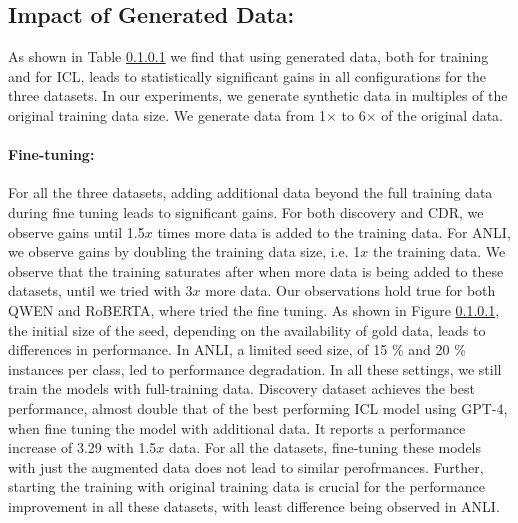 


\subsection{Impact of Generated Data:} 

As shown in Table \ref{} we find that using generated data, both for training and for ICL, leads to statistically significant gains in all configurations for the three datasets. In our experiments, we generate synthetic data in multiples of the original training data size. We generate data from 1$\times$ to 6$\times$ of the original data. 


\paragraph{Fine-tuning:} For all the three datasets, adding additional data beyond the full training data  during fine tuning leads to significant gains. For both discovery and CDR, we observe gains until 1.5$x$ times more data is added to the training data. For ANLI, we observe gains by doubling the training data size, i.e. 1$x$ the training data. We observe that the training saturates after when more data is being added to these datasets, until we tried with 3$x$ more data. Our observations hold true for both QWEN and RoBERTA, where tried the fine tuning. As shown in Figure \ref{}, the initial size of the seed, depending on the availability of gold data, leads to differences in performance. In ANLI, a limited seed size, of 15 \% and 20 \% instances per class, led to performance degradation. In all these settings, we still train the models with full-training data. Discovery dataset achieves the best performance, almost double that of the best performing ICL model using GPT-4, when fine tuning the model with additional data. It reports a performance increase of 3.29 with 1.5$x$ data. For all the datasets, fine-tuning these models with just the augmented data does not lead to similar perofrmances. Further, starting the training with original training data is crucial for the performance improvement in all these datasets, with least difference being observed in ANLI. 



